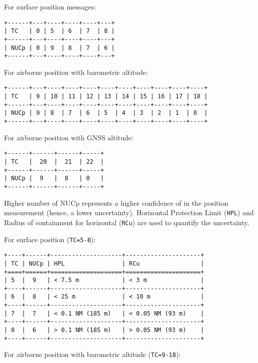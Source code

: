 For surface position messages:

\begin{verbatim}
+------+---+----+----+----+---+
| TC   | 0 | 5  | 6  | 7  | 8 |
+------+---+----+----+----+---+
| NUCp | 0 | 9  | 8  | 7  | 6 |
+------+---+----+----+----+---+
\end{verbatim}

For airborne position with barometric altitude:

\begin{verbatim}
+------+---+----+----+----+----+----+----+----+----+----+
| TC   | 9 | 10 | 11 | 12 | 13 | 14 | 15 | 16 | 17 | 18 |
+------+---+----+----+----+----+----+----+----+----+----+
| NUCp | 9 | 8  | 7  | 6  | 5  | 4  | 3  | 2  | 1  | 0  |
+------+---+----+----+----+----+----+----+----+----+----+
\end{verbatim}

For airborne position with GNSS altitude:

\begin{verbatim}
+------+------+------+-----+
| TC   |  20  |  21  | 22  |
+------+------+------+-----+
| NUCp |  9   |  8   | 0   |
+------+------+------+-----+
\end{verbatim}

Higher number of NUCp represents a higher confidence of in the position
measurement (hence, a lower uncertainty). Horizontal Protection Limit
(\texttt{HPL}) and Radius of containment for horizontal (\texttt{RCu})
are used to quantify the uncertainty.

For surface position (\texttt{TC=5-8}):

\begin{verbatim}
+----+------+--------------------+---------------------+
| TC | NUCp | HPL                | RCu                 |
+====+======+====================+=====================+
| 5  |  9   | < 7.5 m            | < 3 m               |
+----+------+--------------------+---------------------+
| 6  |  8   | < 25 m             | < 10 m              |
+----+------+--------------------+---------------------+
| 7  |  7   | < 0.1 NM (185 m)   | < 0.05 NM (93 m)    |
+----+------+--------------------+---------------------+
| 8  |  6   | > 0.1 NM (185 m)   | > 0.05 NM (93 m)    |
+----+------+--------------------+---------------------+
\end{verbatim}

For airborne position with barometric altitude (\texttt{TC=9-18}):

